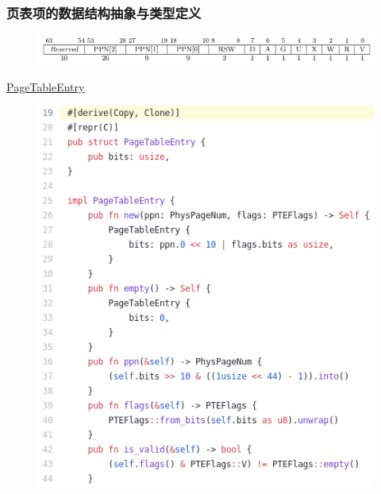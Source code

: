 \begin{frame}
    \frametitle{页表项的数据结构抽象与类型定义}
    \begin{figure}
        \centering
        \includegraphics[width=0.6\linewidth]{figs/sv39-pte.png}
    \end{figure}
% 
% 
% 
\href{https://github.com/rcore-os/rCore-Tutorial-v3/blob/ch4/os/src/mm/page_table.rs\#L21}{PageTableEntry}
% 
    \begin{figure}
        \centering
        \includegraphics[width=0.6\linewidth]{figs/page_table-45.png}
    \end{figure}
% 
% 
\end{frame}
